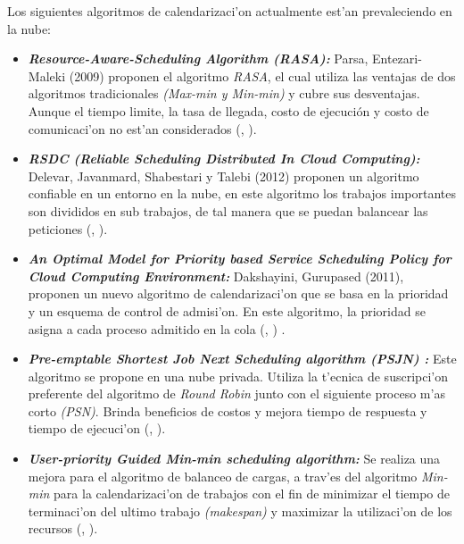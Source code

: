 Los siguientes algoritmos de calendarizaci'on actualmente est'an prevaleciendo en la nube:
\begin{itemize}
	\item \textit{\textbf{Resource-Aware-Scheduling Algorithm (RASA):}} Parsa, Entezari-Maleki (2009) proponen el algoritmo \textit{RASA}, el cual utiliza las ventajas de dos algoritmos tradicionales \textit{(Max-min y Min-min)} y cubre sus desventajas. Aunque el tiempo limite, la tasa de llegada, costo de ejecución y costo de comunicaci'on no est'an considerados (\citeauthor{parsa2009rasa}, \citeyear{parsa2009rasa}).
	
	
	\item \textit{\textbf{RSDC (Reliable Scheduling Distributed In Cloud Computing):}} Delevar, Javanmard, Shabestari y Talebi (2012) proponen un algoritmo confiable en un entorno en la nube, en este algoritmo los trabajos importantes son divididos en sub trabajos, de tal manera que se puedan balancear las peticiones (\citeauthor{delavar2012rsdc}, \citeyear{delavar2012rsdc}).
	
	
	\item \textit{\textbf{An Optimal Model for Priority based Service Scheduling Policy for Cloud Computing Environment:}} Dakshayini, Gurupased (2011), proponen un nuevo algoritmo de calendarizaci'on que se basa en la prioridad y un esquema de control de admisi'on. En este algoritmo, la prioridad se asigna a cada proceso admitido en la cola (\citeauthor{dakshayini2011optimal}, \citeyear{dakshayini2011optimal}) . 
	
	
	\item \textit{\textbf{Pre-emptable Shortest Job Next Scheduling algorithm (PSJN) :}}  Este algoritmo se propone en una nube privada. Utiliza la t'ecnica de suscripci'on preferente del algoritmo de \textit{Round Robin} junto con el siguiente proceso m'as corto \textit{(PSN)}. Brinda beneficios de costos y mejora tiempo de respuesta y tiempo de ejecuci'on (\citeauthor{nishant}, \citeyear{nishant}). 
	
	
	\item \textit{\textbf{User-priority Guided Min-min scheduling algorithm:}} Se realiza una mejora para el algoritmo de balanceo de cargas, a trav'es del algoritmo \textit{Min-min} para la calendarizaci'on de trabajos con el fin de minimizar el tiempo de terminaci'on del ultimo trabajo \textit{(makespan)} y maximizar la utilizaci'on de los recursos (\citeauthor{chen2013user}, \citeyear{chen2013user}). 
\end{itemize}



